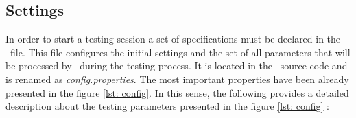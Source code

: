 \subsection{Settings}
\label{usage: settings}
In order to start a testing session a set of specifications must be declared in the \Config\ file. 
This file configures the initial settings and the set of all parameters that will be processed by \toolname\ during the testing process. 
It is located in the \toolname\ source code and is renamed as \textit{config.properties}.
The most important properties have been already presented in the figure \ref{lst: config}.
In this sense, the following provides a detailed description about the testing parameters presented in the figure \ref{lst: config} \cite{monkey, sapienz}: 

